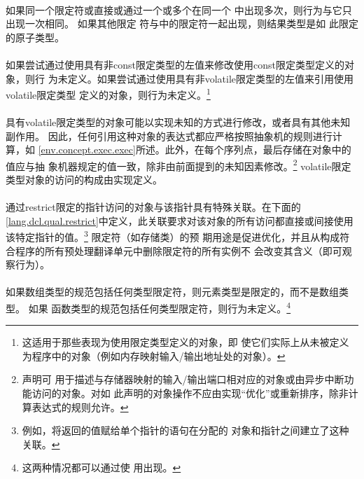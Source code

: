 \paragraph{}
如果同一个限定符或直接或通过一个或多个在同一个
中出现多次，则行为与它只出现一次相同。 如果其他限定
符与中的限定符一起出现，则结果类型是如
此限定的原子类型。

\paragraph{}
如果尝试通过使用具有非const限定类型的左值来修改使用const限定类型定义的对象，则行
为未定义。如果尝试通过使用具有非volatile限定类型的左值来引用使用volatile限定类型
定义的对象，则行为未定义。\footnote{这适用于那些表现为使用限定类型定义的对象，即
使它们实际上从未被定义为程序中的对象（例如内存映射输入/输出地址处的对象）。}

\paragraph{}
具有volatile限定类型的对象可能以实现未知的方式进行修改，或者具有其他未知副作用。
因此，任何引用这种对象的表达式都应严格按照抽象机的规则进行计算，如
\ref{env.concept.exec.exec}所述。此外，在每个序列点，最后存储在对象中的值应与抽
象机器规定的值一致，除非由前面提到的未知因素修改。\footnote{声明可
用于描述与存储器映射的输入/输出端口相对应的对象或由异步中断功能访问的对象。对如
此声明的对象操作不应由实现``优化''或重新排序，除非计算表达式的规则允许。}
volatile限定类型对象的访问的构成由实现定义。

\paragraph{}
通过restrict限定的指针访问的对象与该指针具有特殊关联。在下面的
\ref{lang.dcl.qual.restrict}中定义，此关联要求对该对象的所有访问都直接或间接使用
该特定指针的值。\footnote{例如，将返回的值赋给单个指针的语句在分配的
对象和指针之间建立了这种关联。} 限定符（如存储类）的预
期用途是促进优化，并且从构成符合程序的所有预处理翻译单元中删除限定符的所有实例不
会改变其含义（即可观察行为）。

\paragraph{}
如果数组类型的规范包括任何类型限定符，则元素类型是限定的，而不是数组类型。 如果
函数类型的规范包括任何类型限定符，则行为未定义。\footnote{这两种情况都可以通过使
用出现。}

